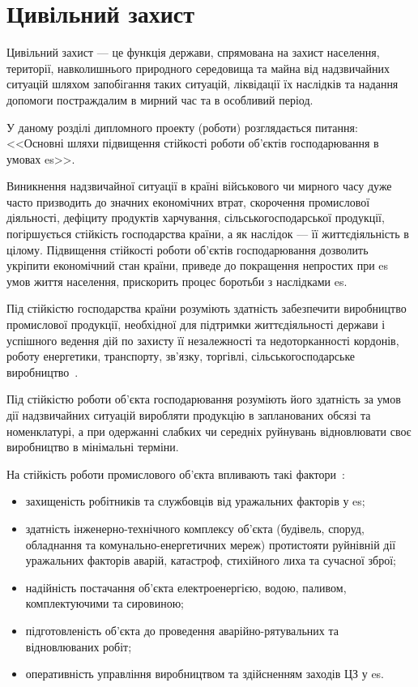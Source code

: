 \section{Цивільний захист}
Цивільний захист --- це функція держави, спрямована на захист населення, території, навколишнього природного середовища та майна від надзвичайних ситуацій шляхом запобігання таких ситуацій, ліквідації їх наслідків та надання допомоги постраждалим в мирний час та в особливий період.

У даному розділі дипломного проекту (роботи) розглядається питання: <<Основні шляхи підвищення стійкості роботи об'єктів господарювання в умовах \acrshort{es}>>.

Виникнення надзвичайної ситуації в країні військового чи мирного часу дуже часто призводить до значних економічних втрат, скорочення промислової діяльності,  дефіциту продуктів харчування, сільськогосподарської продукції, погіршується стійкість господарства країни, а як наслідок --- її життєдіяльність в цілому.
Підвищення стійкості роботи об'єктів господарювання дозволить укріпити економічний стан країни, приведе до покращення непростих при \acrshort{es} умов життя населення, прискорить процес боротьби з наслідками \acrshort{es}.  

Під стійкістю господарства країни розуміють здатність забезпечити виробництво промислової продукції, необхідної для підтримки життєдіяльності
держави і успішного ведення дій по захисту її незалежності та недоторканності кордонів, роботу енергетики, транспорту, зв'язку, торгівлі, сільськогосподарське виробництво~\cite{Civ2}.

Під стійкістю роботи об'єкта господарювання розуміють його здатність за умов дії надзвичайних ситуацій виробляти продукцію в запланованих обсязі та номенклатурі, а при одержанні слабких чи середніх руйнувань відновлювати своє виробництво в мінімальні терміни.

На стійкість роботи промислового об'єкта впливають такі фактори~\cite{Civ3}:
\begin{itemize}
	\item захищеність робітників та службовців від уражальних факторів у \acrshort{es};
	\item здатність інженерно-технічного комплексу об'єкта (будівель, споруд, обладнання та комунально-енергетичних мереж) протистояти руйнівній дії уражальних факторів аварій, катастроф, стихійного лиха та сучасної зброї;
	\item надійність постачання об'єкта електроенергією, водою, паливом, комплектуючими та сировиною;
	\item підготовленість об'єкта до проведення аварійно-рятувальних та відновлюваних робіт;
	\item оперативність управління виробництвом та здійсненням заходів ЦЗ у \acrshort{es}.
\end{itemize}

